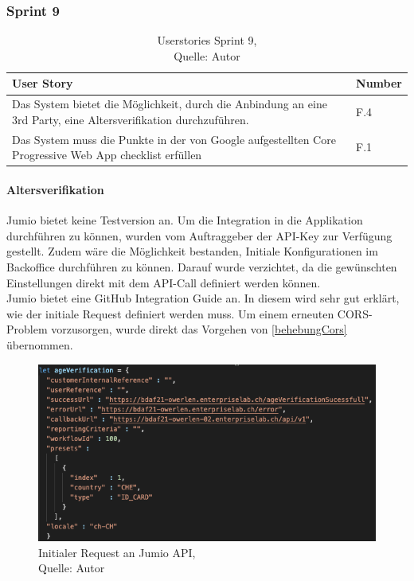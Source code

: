 \subsubsection{Sprint 9}
\begin{table}[H]
	\setlength\extrarowheight{2pt} %
	\begin{tabularx}{\textwidth}{|X|l|}
		\hline
		\textbf{User Story} & \textbf{Number} \\
		\hline
		Das System bietet die Möglichkeit, durch die Anbindung an eine 3rd Party, eine Altersverifikation durchzuführen.& F.4\\
		\hline
		Das System muss die Punkte in der von Google aufgestellten Core Progressive Web App checklist erfüllen& F.1\\
		\hline
	\end{tabularx} 
	\caption[Userstories Sprint 9]{Userstories Sprint 9,\\ Quelle: Autor}
\end{table}\label{userStoriesSprint9}

\paragraph{Altersverifikation}
Jumio bietet keine Testversion an. Um die Integration in die Applikation durchführen zu können, wurden vom Auftraggeber der API-Key zur Verfügung gestellt. Zudem wäre die Möglichkeit bestanden, Initiale Konfigurationen im Backoffice durchführen zu können. Darauf wurde verzichtet, da die gewünschten Einstellungen direkt mit dem API-Call definiert werden können. \\
Jumio bietet eine GitHub Integration Guide an. In diesem wird sehr gut erklärt, wie der initiale Request definiert werden muss. Um einem erneuten CORS-Problem vorzusorgen, wurde direkt das Vorgehen von \ref{behebungCors} übernommen. \\

 \begin{figure}[H]
	\centering
	\includegraphics[scale=0.5]{images/initRequestJumio.PNG}
	\caption[Initialer Request an Jumio API]{Initialer Request an Jumio API,\\ Quelle: Autor}
	\label{img: jumioInitialRequest}
\end{figure} 


